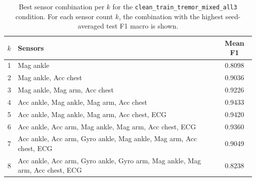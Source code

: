 \begin{table}[H]
    \centering
    \caption{Best sensor combination per $k$ for the \texttt{clean\_train\_tremor\_mixed\_all3} condition. For each sensor count $k$, the combination with the highest seed-averaged test F1 macro is shown.}
    \label{tab:best_combo_clean_train_tremor_mixed_all3}
    \begin{tabular}{clc}
        \toprule
        $k$ & \textbf{Sensors} & \textbf{Mean F1} \\
        \midrule
        1 & Mag ankle & 0.8098 \\
        2 & Mag ankle, Acc chest & 0.9036 \\
        3 & Mag ankle, Mag arm, Acc chest & 0.9226 \\
        4 & Acc ankle, Mag ankle, Mag arm, Acc chest & 0.9433 \\
        5 & Acc ankle, Mag ankle, Mag arm, Acc chest, ECG & 0.9420 \\
        6 & Acc ankle, Acc arm, Mag ankle, Mag arm, Acc chest, ECG & 0.9360 \\
        7 & Acc ankle, Acc arm, Gyro ankle, Mag ankle, Mag arm, Acc chest, ECG & 0.9049 \\
        8 & Acc ankle, Acc arm, Gyro ankle, Gyro arm, Mag ankle, Mag arm, Acc chest, ECG & 0.8238 \\
        \bottomrule
    \end{tabular}
\end{table}
